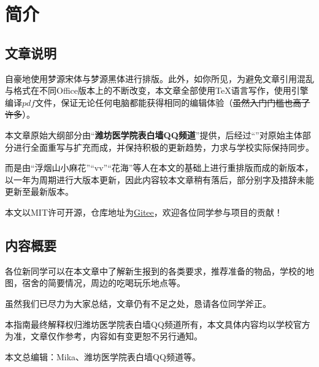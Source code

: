 \chapter[简介]{简介}
\section[文章说明]{文章说明}

自豪地使用梦源宋体与梦源黑体进行排版。此外，如你所见，为避免文章引用混乱与格式在不同Office版本上的不断改变，本文章全部使用\TeX 语言写作，使用\XeLaTeX 引擎编译$pdf$文件，保证无论任何电脑都能获得相同的编辑体验（\sout{虽然入门门槛也高了许多}）。

本文章原始大纲部分由“\textbf{潍坊医学院表白墙QQ频道}”提供，后经过“\textbf{}”对原始主体部分进行全面重写与扩充而成，并保持积极的更新趋势，力求与学校实际保持同步。

而\textbf{}是由“浮烟山小麻花”“vv”“花海”等人在本文的基础上进行重排版而成的新版本，以一年为周期进行大版本更新，因此内容较本文章稍有落后，部分别字及措辞未能更新至最新版本。

\bigbreak
\textbf{}

本文以MIT许可开源，仓库地址为\uline{\href{https://gitee.com/mikazo/guide_for_freshman}{Gitee}}，欢迎各位同学参与项目的贡献！

\section[内容概要]{内容概要}

各位新同学可以在本文章中了解新生报到的各类要求，推荐准备的物品，学校的地图，宿舍的简要情况，周边的吃喝玩乐地点等。

虽然我们已尽力为大家总结，文章仍有不足之处，恳请各位同学斧正。

本指南最终解释权归潍坊医学院表白墙QQ频道所有，本文具体内容均以学校官方为准，文章仅作参考，内容如有变更恕不另行通知。

本文总编辑：Mika、潍坊医学院表白墙QQ频道等。